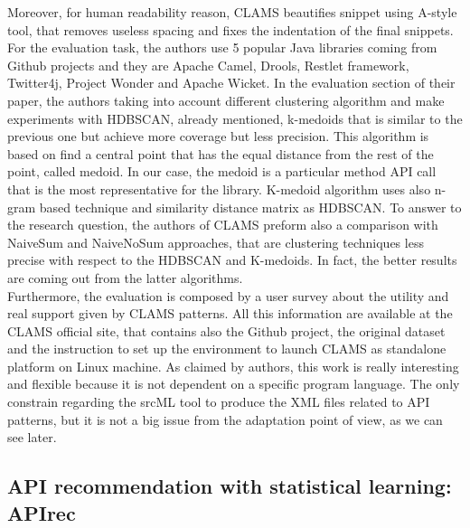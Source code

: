 Moreover, for human readability reason, CLAMS beautifies snippet using A-style tool, that removes useless spacing and fixes the indentation of the final snippets. For the evaluation task, the authors use 5 popular Java libraries coming from Github projects and they are Apache Camel, Drools, Restlet framework, Twitter4j, Project Wonder and Apache Wicket. In the evaluation section of their paper, the authors taking into account different clustering algorithm and make experiments with HDBSCAN, already mentioned, k-medoids that is similar to the previous one but achieve more coverage but less precision. This algorithm is based on find a central point that has the equal distance from the rest of the point, called medoid. In our case, the medoid is a particular method API call that is the most representative for the library. K-medoid algorithm uses also n-gram based technique and similarity distance matrix as HDBSCAN. To answer to the research question, the authors of CLAMS preform also a comparison with NaiveSum and NaiveNoSum approaches, that are clustering techniques less precise with respect to the HDBSCAN and K-medoids. In fact, the better results are coming out from the latter algorithms. \\
Furthermore, the evaluation is composed by a user survey about the utility and real support given by CLAMS patterns. All this information are available at the CLAMS official site, that contains also the Github project, the original dataset and the instruction to set up the environment to launch CLAMS as standalone platform on Linux machine. As claimed by authors, this work is really interesting and flexible because it is not dependent on a specific program language. The only constrain regarding the srcML tool to produce the XML files related to API patterns, but it is not a big issue from the adaptation point of view, as we can see later.



\subsection{API recommendation with statistical learning: APIrec}

